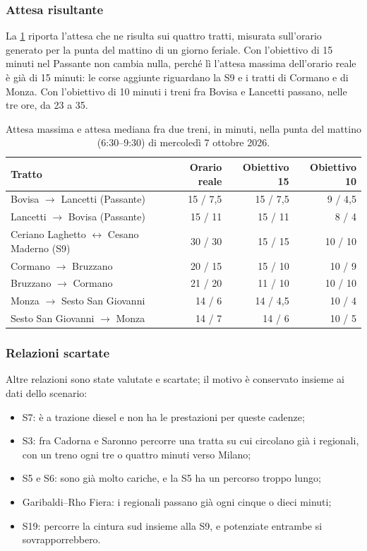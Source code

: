 \subsubsection{Attesa risultante}
La \cref{tab:scenari-attese} riporta l'attesa che ne risulta sui quattro tratti, misurata sull'orario generato per la punta del mattino di un giorno feriale. Con l'obiettivo di 15 minuti nel Passante non cambia nulla, perché lì l'attesa massima dell'orario reale è già di 15 minuti: le corse aggiunte riguardano la S9 e i tratti di Cormano e di Monza. Con l'obiettivo di 10 minuti i treni fra Bovisa e Lancetti passano, nelle tre ore, da 23 a 35.

\begin{table}[H]
	\centering
	\caption{Attesa massima e attesa mediana fra due treni, in minuti, nella punta del mattino (6:30--9:30) di mercoledì 7 ottobre 2026.}
	\label{tab:scenari-attese}
	\begin{tabularx}{\textwidth}{Xrrr}
		\toprule
		Tratto & Orario reale & Obiettivo 15 & Obiettivo 10 \\
		\midrule
		Bovisa $\rightarrow$ Lancetti (Passante) & 15 / 7,5 & 15 / 7,5 & 9 / 4,5 \\
		Lancetti $\rightarrow$ Bovisa (Passante) & 15 / 11 & 15 / 11 & 8 / 4 \\
		Ceriano Laghetto $\leftrightarrow$ Cesano Maderno (S9) & 30 / 30 & 15 / 15 & 10 / 10 \\
		Cormano $\rightarrow$ Bruzzano & 20 / 15 & 15 / 10 & 10 / 9 \\
		Bruzzano $\rightarrow$ Cormano & 21 / 20 & 11 / 10 & 10 / 10 \\
		Monza $\rightarrow$ Sesto San Giovanni & 14 / 6 & 14 / 4,5 & 10 / 4 \\
		Sesto San Giovanni $\rightarrow$ Monza & 14 / 7 & 14 / 6 & 10 / 5 \\
		\bottomrule
	\end{tabularx}
\end{table}

\subsubsection{Relazioni scartate}
Altre relazioni sono state valutate e scartate; il motivo è conservato insieme ai dati dello scenario:
\begin{itemize}
	\item S7: è a trazione diesel e non ha le prestazioni per queste cadenze;
	\item S3: fra Cadorna e Saronno percorre una tratta su cui circolano già i regionali, con un treno ogni tre o quattro minuti verso Milano;
	\item S5 e S6: sono già molto cariche, e la S5 ha un percorso troppo lungo;
	\item Garibaldi--Rho Fiera: i regionali passano già ogni cinque o dieci minuti;
	\item S19: percorre la cintura sud insieme alla S9, e potenziate entrambe si sovrapporrebbero.
\end{itemize}

